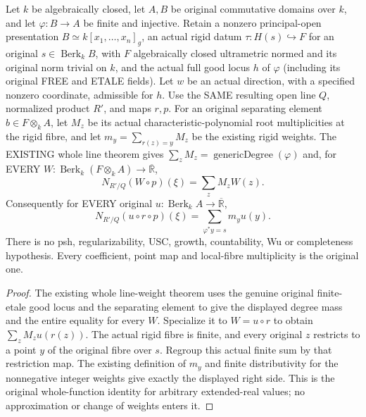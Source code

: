 \begin{lemma}
\label{lem:nf-whole-rigid-weighted-norm}
\leanok
{}
Let $k$ be algebraically closed, let $A,B$ be original commutative
domains over $k$, and let $\varphi:B\to A$ be finite and injective.
Retain a nonzero principal-open presentation $B\simeq k[x_1,\ldots,x_n]_g$,
an actual rigid datum $\tau:H(s)\hookrightarrow F$ for an original
$s\in\operatorname{Berk}_k B$, with $F$ algebraically closed
ultrametric normed and its original norm trivial on $k$, and the actual
full good locus $h$ of $\varphi$ (including its original FREE and ETALE
fields). Let $w$ be an actual direction, with a specified nonzero
coordinate, admissible for $h$. Use the SAME resulting open line $Q$,
normalized product $R'$, and maps $r,p$.
For an original separating element $b\in F\otimes_k A$, let $M_z$
be its actual characteristic-polynomial root multiplicities at the
rigid fibre, and let $m_y=\sum_{r(z)=y}M_z$ be the existing rigid weights.
The EXISTING whole line theorem gives
$\sum_z M_z=\operatorname{genericDegree}(\varphi)$ and, for EVERY
$W:\operatorname{Berk}_k(F\otimes_k A)\to\overline{\mathbb R}$,
\[
 N_{R'/Q}(W\circ p)(\xi)=\sum_zM_zW(z).
\]
Consequently for EVERY original $u:\operatorname{Berk}_k A\to\overline{\mathbb R}$,
\[
 N_{R'/Q}(u\circ r\circ p)(\xi)
   =\sum_{\varphi^*y=s}m_yu(y).
\]
There is no psh, regularizability, USC, growth, countability, Wu or
completeness hypothesis. Every coefficient, point map and local-fibre
multiplicity is the original one.
\end{lemma}
\begin{proof}
The existing whole line-weight theorem uses the genuine original finite-etale good locus and the separating element to give the displayed degree mass and the entire equality for every $W$. Specialize it to $W=u\circ r$ to obtain $\sum_zM_zu(r(z))$. The actual rigid fibre is finite,
and every original $z$ restricts to a point $y$ of the original fibre
over $s$. Regroup this actual finite sum by that restriction map.
The existing definition of $m_y$ and finite distributivity for the
nonnegative integer weights give exactly the displayed right side.
This is the original whole-function identity for arbitrary extended-real
values; no approximation or change of weights enters it.
\end{proof}
